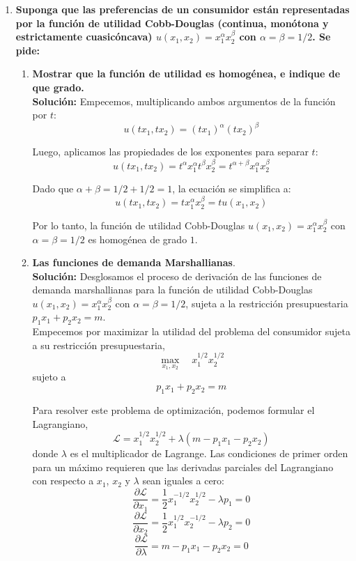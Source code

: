 \begin{enumerate}
\begin{enumerate}[\bfseries a)]
	\end{enumerate}

    \item \textbf{\boldmath Suponga que las preferencias de un consumidor están representadas por la función de utilidad Cobb-Douglas (continua, monótona y estrictamente cuasicóncava) $u(x_1, x_2) = x_1^\alpha x_2^\beta$ con $\alpha=\beta=1/2$. Se pide:}

	\begin{enumerate}[\bfseries a)]

	    \item \textbf{Mostrar que la función de utilidad es homogénea, e indique de que grado.}\\

		\textbf{Solución:} Empecemos, multiplicando ambos argumentos de la función por $t$:
		$$u(tx_1, tx_2) = (tx_1)^\alpha (tx_2)^\beta$$

		Luego, aplicamos las propiedades de los exponentes para separar $t$:
		$$u(tx_1, tx_2) = t^\alpha x_1^\alpha t^\beta x_2^\beta = t^{\alpha + \beta} x_1^\alpha x_2^\beta$$

		Dado que $\alpha + \beta = 1/2 + 1/2 = 1$, la ecuación se simplifica a:
		$$u(tx_1, tx_2) = t x_1^\alpha x_2^\beta = t u(x_1, x_2)$$

		Por lo tanto, la función de utilidad Cobb-Douglas $u(x_1, x_2) = x_1^\alpha x_2^\beta$ con $\alpha=\beta=1/2$ es homogénea de grado $1$.\\

	    \item \textbf{Las funciones de demanda Marshallianas}.\\

		\textbf{Solución:} Desglosamos el proceso de derivación de las funciones de demanda marshallianas para la función de utilidad Cobb-Douglas $u(x_1, x_2) = x_1^\alpha x_2^\beta$ con $\alpha=\beta=1/2$, sujeta a la restricción presupuestaria $p_1x_1 + p_2x_2 = m$.\\

		Empecemos por maximizar la utilidad del problema del consumidor sujeta a su restricción presupuestaria,
		$$\max_{x_1,x_2} \quad x_1^{1/2} x_2^{1/2}$$
		sujeto a
		$$p_1x_1 + p_2x_2 = m$$

		Para resolver este problema de optimización, podemos formular el Lagrangiano, 
		$$\mathcal{L} = x_1^{1/2} x_2^{1/2} + \lambda(m - p_1x_1 - p_2x_2)$$
		donde $\lambda$ es el multiplicador de Lagrange. Las condiciones de primer orden para un máximo requieren que las derivadas parciales del Lagrangiano con respecto a $x_1$, $x_2$ y $\lambda$ sean iguales a cero:
		$$\frac{\partial \mathcal{L}}{\partial x_1} = \frac{1}{2} x_1^{-1/2} x_2^{1/2} - \lambda p_1 = 0$$
		$$\frac{\partial \mathcal{L}}{\partial x_2} = \frac{1}{2} x_1^{1/2} x_2^{-1/2} - \lambda p_2 = 0$$
		$$\frac{\partial \mathcal{L}}{\partial \lambda} = m - p_1x_1 - p_2x_2 = 0$$


\end{enumerate}
\end{enumerate}

